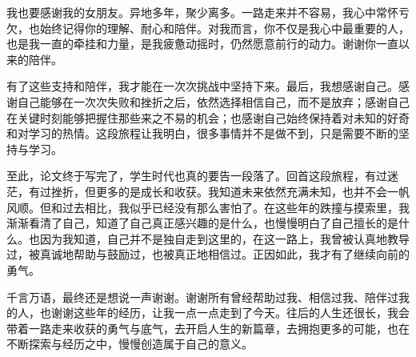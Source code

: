 \documentclass[type = master, class = professional]{whu-thesis}
\begin{document}
\begin{acknowledgements}
我也要感谢我的女朋友。异地多年，聚少离多。一路走来并不容易，我心中常怀亏欠，也始终记得你的理解、耐心和陪伴。对我而言，你不仅是我心中最重要的人，也是我一直的牵挂和力量，是我疲惫动摇时，仍然愿意前行的动力。谢谢你一直以来的陪伴。

有了这些支持和陪伴，我才能在一次次挑战中坚持下来。最后，我想感谢自己。感谢自己能够在一次次失败和挫折之后，依然选择相信自己，而不是放弃；感谢自己在关键时刻能够把握住那些来之不易的机会；也感谢自己始终保持着对未知的好奇和对学习的热情。这段旅程让我明白，很多事情并不是做不到，只是需要不断的坚持与学习。

至此，论文终于写完了，学生时代也真的要告一段落了。回首这段旅程，有过迷茫，有过挫折，但更多的是成长和收获。我知道未来依然充满未知，也并不会一帆风顺。但和过去相比，我似乎已经没有那么害怕了。在这些年的跌撞与摸索里，我渐渐看清了自己，知道了自己真正感兴趣的是什么，也慢慢明白了自己擅长的是什么。也因为我知道，自己并不是独自走到这里的，在这一路上，我曾被认真地教导过，被真诚地帮助与鼓励过，也被真正地相信过。正因如此，我才有了继续向前的勇气。

千言万语，最终还是想说一声谢谢。谢谢所有曾经帮助过我、相信过我、陪伴过我的人，也谢谢这些年的经历，让我一点一点走到了今天。往后的人生还很长，我会带着一路走来收获的勇气与底气，去开启人生的新篇章，去拥抱更多的可能，也在不断探索与经历之中，慢慢创造属于自己的意义。
\end{acknowledgements}

\appendix

\end{document}
